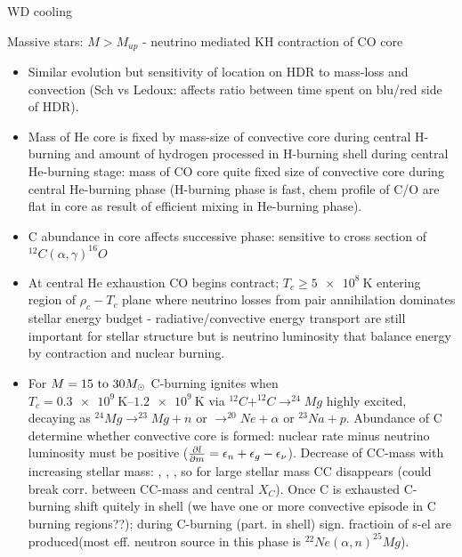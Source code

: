 \begin{frame}{WD cooling}
    
\end{frame}

\begin{frame}{Massive stars: $M>M_{up}$ - neutrino mediated KH contraction of CO core}
    \begin{itemize}
        \item Similar evolution but sensitivity of location on HDR to mass-loss and convection (Sch vs Ledoux: affects ratio between time spent on blu/red side of HDR).
        \item Mass of He core is fixed by mass-size of convective core during central H-burning and amount of hydrogen processed in H-burning shell during central He-burning stage: mass of CO core quite fixed size of convective core during central He-burning phase (H-burning phase is fast, chem profile of C/O are flat in core as result of efficient mixing in He-burning phase).
        \item C abundance in core affects successive phase: sensitive to cross section of $^{12}C(\alpha,\gamma)^{16}O$
        \item At central He exhaustion CO begins contract; $T_c\geq\SI{5e8}{\kelvin}$ entering region of $\rho_c-T_c$ plane where neutrino losses from pair annihilation dominates stellar energy budget - radiative/convective energy transport are still important for stellar structure but is neutrino luminosity that balance energy by contraction and nuclear burning.
        \item For $M=\numrange{15}{30}\msun{}$ C-burning ignites when $T_c=\SIrange{0.3e9}{1.2e9}{\kelvin}$ via $^{12}C+^{12}C\to^{24}Mg$ highly excited, decaying as $^{24}Mg\to^{23}Mg+n$ or $\to^{20}Ne+\alpha$ or $^{23}Na+p$. Abundance of C determine whether convective core is formed: nuclear rate minus neutrino luminosity must be positive ($\PDy{m}{l}=\epsilon_n+\epsilon_g-\epsilon_{\nu}$). Decrease of CC-mass with increasing stellar mass: , , \xaumenta{\epsilon_{\nu}}, so for large stellar mass CC disappears (could break corr. between CC-mass and central $X_C$). Once C is exhausted C-burning shift quitely in shell (we have one or more convective episode in C burning regions??); during C-burning (part. in shell) sign. fractioin of s-el are produced(most eff. neutron source in this phase is $^{22}Ne(\alpha,n)^{25}Mg$).
    \end{itemize}
\end{frame}

